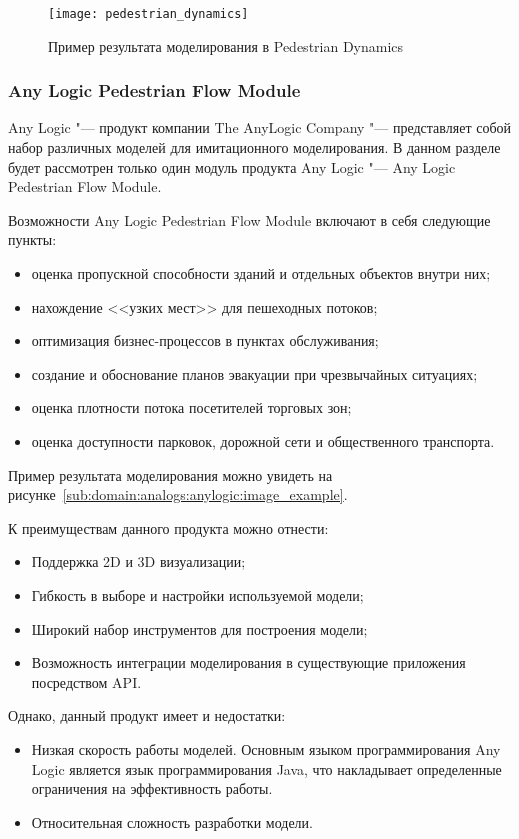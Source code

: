 \begin{figure}[ht!]
  \texttt{[image: pedestrian\_dynamics]}
  \caption{Пример результата моделирования в Pedestrian Dynamics}
  \label{sub:domain:analogs:pd:image_example}
\end{figure}

\subsubsection{Any Logic Pedestrian Flow Module}
\label{sub:domain:analogs:anylogic}

Any Logic \textregistered "--- продукт компании The AnyLogic Company "--- представляет собой набор различных моделей для имитационного моделирования.
В данном разделе будет рассмотрен только один модуль продукта Any Logic \textregistered "--- Any Logic Pedestrian Flow Module.

Возможности Any Logic Pedestrian Flow Module включают в себя следующие пункты:
\begin{itemize}
  \item оценка пропускной способности зданий и отдельных объектов внутри них;
  \item нахождение <<узких мест>> для пешеходных потоков;
  \item оптимизация бизнес-процессов в пунктах обслуживания;
  \item создание и обоснование планов эвакуации при чрезвычайных ситуациях;
  \item оценка плотности потока посетителей торговых зон;
  \item оценка доступности парковок, дорожной сети и общественного транспорта.
\end{itemize}

Пример результата моделирования можно увидеть на рисунке~\ref{sub:domain:analogs:anylogic:image_example}.

К преимуществам данного продукта можно отнести:
\begin{itemize}
  \item Поддержка 2D и 3D визуализации;
  \item Гибкость в выборе и настройки используемой модели;
  \item Широкий набор инструментов для построения модели;
  \item Возможность интеграции моделирования в существующие приложения посредством API.
\end{itemize}

Однако, данный продукт имеет и недостатки:
\begin{itemize}
  \item Низкая скорость работы моделей. Основным языком программирования Any Logic \textregistered является язык программирования Java, что накладывает определенные ограничения на эффективность работы.
  \item Относительная сложность разработки модели.
\end{itemize}

